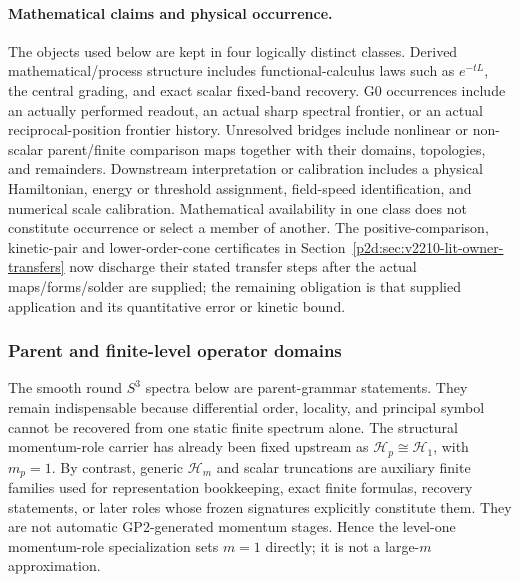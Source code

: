 \documentclass[12pt,a4paper]{article}
\begin{document}
\paragraph{Mathematical claims and physical occurrence.}
The objects used below are kept in four logically distinct classes.  Derived
mathematical/process structure includes functional-calculus laws such as
\(e^{-tL}\), the central grading, and exact scalar fixed-band recovery.  G0
occurrences include an actually performed readout, an actual sharp spectral
frontier, or an actual reciprocal-position frontier history.  Unresolved
bridges include nonlinear or non-scalar parent/finite comparison maps together
with their domains, topologies, and remainders.  Downstream interpretation or
calibration includes a physical Hamiltonian, energy or threshold assignment,
field-speed identification, and numerical scale calibration.  Mathematical
availability in one class does not constitute occurrence or select a member of
another. The positive-comparison, kinetic-pair and lower-order-cone certificates in Section~\ref{p2d:sec:v2210-lit-owner-transfers} now discharge their stated transfer steps after the actual maps/forms/solder are supplied; the remaining obligation is that supplied application and its quantitative error or kinetic bound.


\subsubsection{Parent and finite-level operator domains}
\label{p2d:subsec:v2-recovery-contract}
The smooth round \(S^3\) spectra below are parent-grammar statements.  They
remain indispensable because differential order, locality, and principal
symbol cannot be recovered from one static finite spectrum alone.  The
structural momentum-role carrier has already been fixed upstream as
\(\mathcal H_p\cong\mathcal H_1\), with \(m_p=1\).  By contrast, generic
\(\mathcal H_m\) and scalar truncations are auxiliary finite families used for
representation bookkeeping, exact finite formulas, recovery statements, or
later roles whose frozen signatures explicitly constitute them.  They are not
automatic GP2-generated momentum stages.  Hence the level-one momentum-role
specialization sets \(m=1\) directly; it is not a large-\(m\) approximation.
\end{document}
